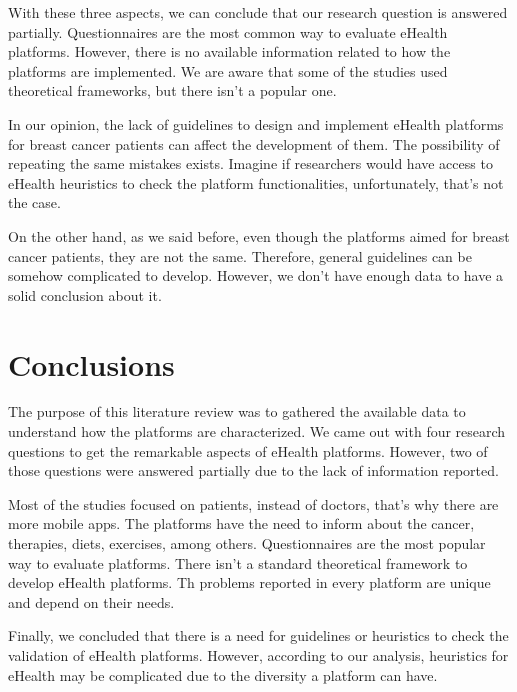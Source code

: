 \documentclass[conference]{IEEEtran}
\begin{document}
With these three aspects, we can conclude that our research question is answered partially. Questionnaires are the most common way to evaluate eHealth platforms. However, there is no available information related to how the platforms are implemented. We are aware that some of the studies used theoretical frameworks, but there isn't a popular one.

In our opinion, the lack of guidelines to design and implement eHealth platforms for breast cancer patients can affect the development of them. The possibility of repeating the same mistakes exists. Imagine if researchers would have access to eHealth heuristics to check the platform functionalities, unfortunately, that's not the case.

On the other hand, as we said before, even though the platforms aimed for breast cancer patients, they are not the same. Therefore, general guidelines can be somehow complicated to develop. However, we don't have enough data to have a solid conclusion about it.

\section{Conclusions}

The purpose of this literature review was to gathered the available data to understand how the platforms are characterized. We came out with four research questions to get the remarkable aspects of eHealth platforms. However, two of those questions were answered partially due to the lack of information reported.

Most of the studies focused on patients, instead of doctors, that's why there are more mobile apps. The platforms have the need to inform about the cancer, therapies, diets, exercises, among others. Questionnaires are the most popular way to evaluate platforms. There isn't a standard theoretical framework to develop eHealth platforms. Th problems reported in every platform are unique and depend on their needs.

Finally, we concluded that there is a need for guidelines or heuristics to check the validation of eHealth platforms. However, according to our analysis, heuristics for eHealth may be complicated due to the diversity a platform can have.




\end{document}
